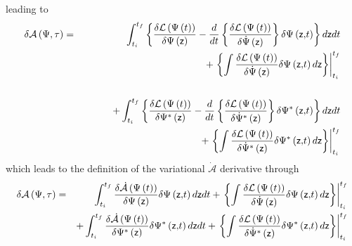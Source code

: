 \documentclass[aps,preprint]{revtex4}
\begin{document}
leading to 
\begin{eqnarray}
\delta \mathcal{A}\left( \Psi ,\tau \right) &=&\int_{t_{i}}^{t_{f}}\left\{ 
\frac{\delta \mathcal{L}\left( \Psi \left( t\right) \right) }{\delta \Psi
\left( \mathsf{z}\right) }-\frac{d}{dt}\left\{ \frac{\delta \mathcal{L}%
\left( \Psi \left( t\right) \right) }{\delta \dot{\Psi}\left( \mathsf{z}%
\right) }\right\} \delta \Psi \left( \mathsf{z,}t\right) \right\} d\mathsf{z}%
dt  \notag \\
&&\qquad \qquad \qquad \qquad \qquad \qquad +\left. \left\{ \int \frac{%
\delta \mathcal{L}\left( \Psi \left( t\right) \right) }{\delta \dot{\Psi}%
\left( \mathsf{z}\right) }\delta \Psi \left( \mathsf{z,}t\right) d\mathsf{z}%
\right\} \right\vert _{t_{i}}^{t_{f}}  \notag \\
&&  \notag \\
&&+\int_{t_{i}}^{t_{f}}\left\{ \frac{\delta \mathcal{L}\left( \Psi \left(
t\right) \right) }{\delta \Psi ^{\ast }\left( \mathsf{z}\right) }-\frac{d}{dt%
}\left\{ \frac{\delta \mathcal{L}\left( \Psi \left( t\right) \right) }{%
\delta \dot{\Psi}^{\ast }\left( \mathsf{z}\right) }\right\} \delta \Psi
^{\ast }\left( \mathsf{z,}t\right) \right\} d\mathsf{z}dt  \notag \\
&&\qquad \qquad \qquad \qquad \qquad \qquad +\left. \left\{ \int \frac{%
\delta \mathcal{L}\left( \Psi \left( t\right) \right) }{\delta \dot{\Psi}%
^{\ast }\left( \mathsf{z}\right) }\delta \Psi ^{\ast }\left( \mathsf{z,}%
t\right) d\mathsf{z}\right\} \right\vert _{t_{i}}^{t_{f}}
\end{eqnarray}%
which leads to the definition of the variational $\mathcal{\dot{A}}$
derivative through 
\begin{eqnarray}
\delta \mathcal{A}\left( \Psi ,\tau \right) &=&\int_{t_{i}}^{t_{f}}\frac{%
\delta \mathcal{\dot{A}}\left( \Psi \left( t\right) \right) }{\delta \Psi
\left( \mathsf{z}\right) }\delta \Psi \left( \mathsf{z,}t\right) d\mathsf{z}%
dt+\left. \left\{ \int \frac{\delta \mathcal{L}\left( \Psi \left( t\right)
\right) }{\delta \dot{\Psi}\left( \mathsf{z}\right) }\delta \Psi \left( 
\mathsf{z,}t\right) d\mathsf{z}\right\} \right\vert _{t_{i}}^{t_{f}}  \notag
\\
&&+\int_{t_{i}}^{t_{f}}\frac{\delta \mathcal{\dot{A}}\left( \Psi \left(
t\right) \right) }{\delta \Psi ^{\ast }\left( \mathsf{z}\right) }\delta \Psi
^{\ast }\left( \mathsf{z,}t\right) d\mathsf{z}dt+\left. \left\{ \int \frac{%
\delta \mathcal{L}\left( \Psi \left( t\right) \right) }{\delta \dot{\Psi}%
^{\ast }\left( \mathsf{z}\right) }\delta \Psi ^{\ast }\left( \mathsf{z,}%
t\right) d\mathsf{z}\right\} \right\vert _{t_{i}}^{t_{f}}
\end{eqnarray}%
\end{document}

